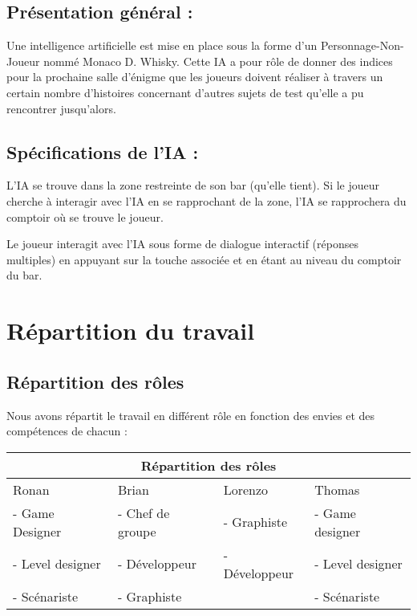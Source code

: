 \documentclass[a4paper,11pt]{article}
\begin{document}
\subsection{Présentation général :}

Une intelligence artificielle est mise en place sous la 
forme d’un Personnage-Non-Joueur nommé Monaco D. Whisky. 
Cette IA a pour rôle de donner des indices pour la prochaine salle d’énigme que les 
joueurs doivent réaliser à travers un certain nombre d’histoires concernant d’autres sujets de 
test qu’elle a pu rencontrer jusqu’alors.


\subsection{Spécifications de l’IA :}

L’IA se trouve dans la zone restreinte de son bar (qu’elle tient). Si le joueur cherche à 
interagir avec l’IA en se rapprochant de la zone, l’IA se rapprochera du comptoir où se trouve le joueur.\newline

Le joueur interagit avec l’IA sous forme de dialogue interactif (réponses multiples) 
en appuyant sur la touche associée et en étant au niveau du comptoir du bar.


\section{Répartition du travail}

\subsection{Répartition des rôles}

Nous avons répartit le travail en différent rôle en fonction des envies 
et des compétences de chacun :\newline

\begin{tabular}{ |p{3cm}|p{3cm}|p{3cm}|p{3cm}|  }
    \hline
    \multicolumn{4}{|c|}{Répartition des rôles} \\
    \hline
     Ronan & Brian & Lorenzo & Thomas\\
    \hline
     - Game Designer & - Chef de groupe & - Graphiste & - Game designer\\
     - Level designer & - Développeur & - Développeur & - Level designer\\
     - Scénariste & - Graphiste & & - Scénariste\\
    \hline
\end{tabular}
\break
\newline
\end{document}
